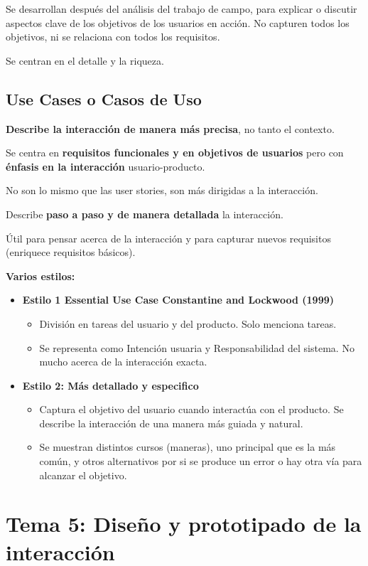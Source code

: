 \documentclass[12pt, twoside, openright]{report} %
\begin{document}
Se desarrollan después del análisis del trabajo de campo, para explicar
o discutir aspectos clave de los objetivos de los usuarios en acción. No
capturen todos los objetivos, ni se relaciona con todos los requisitos.

Se centran en el detalle y la riqueza.

\section{Use Cases o Casos de Uso}

\textbf{Describe la interacción de manera más precisa}, no tanto el
contexto.

Se centra en \textbf{requisitos funcionales y en objetivos de usuarios} pero
con \textbf{énfasis en la interacción} usuario-producto.

No son lo mismo que las user stories, son más dirigidas a la
interacción.

Describe \textbf{paso a paso y de manera detallada} la interacción.

Útil para pensar acerca de la interacción y para capturar nuevos
requisitos (enriquece requisitos básicos).

\textbf{Varios estilos:}

\begin{itemize}
	\item \textbf{Estilo 1 Essential Use Case Constantine and Lockwood (1999)}
		\begin{itemize}
			\item División en tareas del usuario y del producto. Solo menciona tareas.
			\item Se representa como Intención usuaria y Responsabilidad del sistema. No mucho acerca de la interacción exacta.
		\end{itemize}
	\item \textbf{Estilo 2: Más detallado y especifico}
		\begin{itemize}
			\item Captura el objetivo del usuario cuando interactúa con el producto. Se describe la interacción de una manera más guiada y natural.
			\item Se muestran distintos cursos (maneras), uno principal que es la más común, y otros alternativos por si se produce un error o hay otra vía para alcanzar el objetivo.
		\end{itemize}
\end{itemize}

\chapter{Tema 5: Diseño y prototipado de la interacción}
\end{document}
